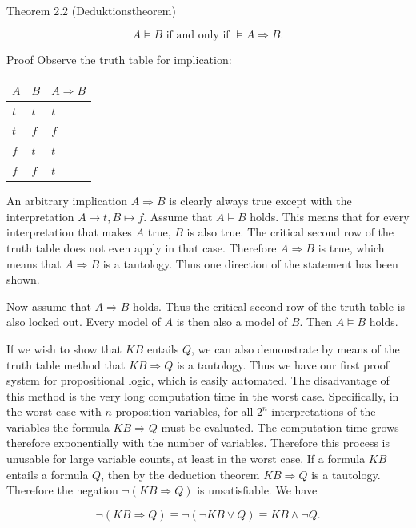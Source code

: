 \documentclass[10pt]{book}
\begin{document}
Theorem 2.2 (Deduktionstheorem)

$$
A \models B \text{ if and only if } \models A \Rightarrow B \text{.}
$$

Proof Observe the truth table for implication:

\begin{center}
\begin{tabular}{lll}
\hline
$A$ & $B$ & $A \Rightarrow B$ \\
\hline
$t$ & $t$ & $t$ \\
\hline
$t$ & $f$ & $f$ \\
\hline
$f$ & $t$ & $t$ \\
\hline
$f$ & $f$ & $t$ \\
\hline
\end{tabular}
\end{center}

An arbitrary implication $A \Rightarrow B$ is clearly always true except with the interpretation $A \longmapsto t, B \longmapsto f$. Assume that $A \models B$ holds. This means that for every interpretation that makes $A$ true, $B$ is also true. The critical second row of the truth table does not even apply in that case. Therefore $A \Rightarrow B$ is true, which means that $A \Rightarrow B$ is a tautology. Thus one direction of the statement has been shown.

Now assume that $A \Rightarrow B$ holds. Thus the critical second row of the truth table is also locked out. Every model of $A$ is then also a model of $B$. Then $A \models B$ holds.

If we wish to show that $K B$ entails $Q$, we can also demonstrate by means of the truth table method that $K B \Rightarrow Q$ is a tautology. Thus we have our first proof system for propositional logic, which is easily automated. The disadvantage of this method is the very long computation time in the worst case. Specifically, in the worst case with $n$ proposition variables, for all $2^{n}$ interpretations of the variables the formula $K B \Rightarrow Q$ must be evaluated. The computation time grows therefore exponentially with the number of variables. Therefore this process is unusable for large variable counts, at least in the worst case.
If a formula $K B$ entails a formula $Q$, then by the deduction theorem $K B \Rightarrow Q$ is a tautology. Therefore the negation $\neg(K B \Rightarrow Q)$ is unsatisfiable. We have

$$
\neg(K B \Rightarrow Q) \equiv \neg(\neg K B \vee Q) \equiv K B \wedge \neg Q .
$$
\end{document}
